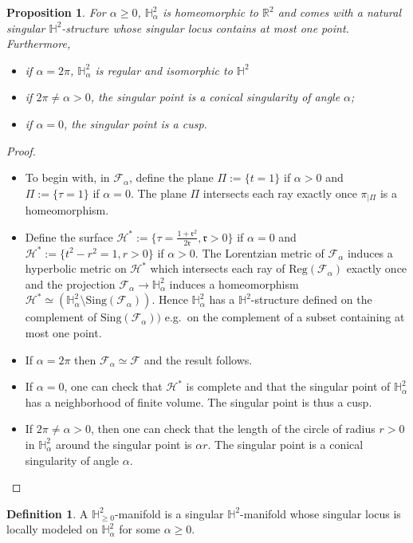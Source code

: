 \documentclass[a4paper,12pt]{article}
\def\r{\mathfrak{r}}
\def\H{\mathbb{H}}
\def\sing{\mathrm{Sing}}
\def\RR{\mathbb{R}}
\def\Reg{\mathrm{Reg}}
\def\reg{\Reg}
\def\Future{\mathcal F}
\def\sing{\mathrm{Sing}}
\def\reg{\mathrm{Reg}}
\def\Reg{\mathrm{Reg}}
\def\r{\mathfrak{r}}
\def\sing{\mathrm{Sing}}
\newtheorem{prop}[lem]{Proposition}
\theoremstyle{definition}
\newtheorem{defi}[lem]{Definition}	%
\begin{document}
\begin{prop} For $\alpha \geq 0$, $\H^2_\alpha$ is homeomorphic to $\RR^2$ and comes with a natural singular $\H^2$-structure whose singular locus contains at most one point. 
		Furthermore,
		\begin{itemize}
		 \item if $\alpha=2\pi$, $\H^2_\alpha$ is regular and isomorphic to $\H^2$
		 \item if $2\pi\neq\alpha>0$, the singular point is a conical singularity of angle $\alpha$;
		 \item if $\alpha=0$, the singular point is a cusp.
		\end{itemize}
		\end{prop}
		\begin{proof}
			\begin{itemize}
			 \item To begin with, in $\Future_\alpha$, define the plane $\Pi:= \{t=1\}$ if $\alpha>0$ and $\Pi:=\{\tau=1\}$ if $\alpha=0$. The plane $\Pi$ intersects each ray exactly once $\pi_{|\Pi}$ is a homeomorphism.
			 
			 \item Define the surface $\mathcal{H}^*:= \{\tau=\frac{1+\r^2}{2\r},\r>0\}$ if $\alpha=0$ and $\mathcal{H}^*:= \{t^2-r^2=1, r>0\}$ if $\alpha >0 $. The Lorentzian metric of $\Future_\alpha$ induces a hyperbolic metric on $\mathcal{H}^*$ which intersects each ray of $\reg(\Future_\alpha)$ exactly once and the projection $\Future_\alpha\rightarrow \H^2_\alpha$ induces a homeomorphism $\mathcal{H}^* \simeq (\H^2_\alpha\setminus \sing(\Future_\alpha))$. Hence $\H^2_\alpha$ has a $\H^2$-structure defined on the complement of $\sing(\Future_\alpha))$ e.g.\ on the complement of a subset containing at most one point. 
			 
			 \item If $\alpha=2\pi$ then $\Future_\alpha\simeq \Future$ and the result follows.
			 \item If $\alpha=0$, one can check that $\mathcal{H}^*$ is complete and that the singular point of $\H^2_\alpha$ has a neighborhood of finite volume. The singular point is thus a cusp.
			 \item If $2\pi\neq \alpha>0$, then one can check that the length of the circle of radius $r>0$ in $\H^2_\alpha$ around the singular point is $\alpha r$. The singular point is a conical singularity of angle $\alpha$.
			\end{itemize}\end{proof}
		\begin{defi} \label{defi:Hgeq0} A $\H^2_{\geq 0}$-manifold is a singular $\H^2$-manifold whose singular locus is locally modeled on $\H^2_{\alpha}$  
		 for some $\alpha\geq 0$.
		\end{defi}
\end{document}
